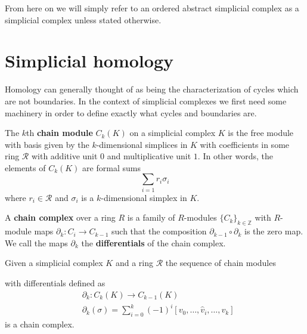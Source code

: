 From here on we will simply refer to an ordered abstract simplicial complex as a simplicial complex unless stated otherwise.
\section{Simplicial homology}
Homology can generally thought of as being the characterization of cycles which are not boundaries. In the context of simplicial complexes we first need some machinery in order to define exactly what cycles and boundaries are.

\begin{definition}
  The $k$th \textbf{chain module} $C_{k}(K)$ on a simplicial complex $K$ is the free module with basis given by the $k$-dimensional simplices in $K$ with coefficients in some ring $\mathcal{R}$ with additive unit $0$ and multiplicative unit $1$. In other words, the elements of $C_{k}(K)$ are formal sums
  \[ \sum_{i=1} r_{i}\sigma_{i}\]
  where $r_{i} \in \mathcal{R}$ and $\sigma_{i}$ is a $k$-dimensional simplex in $K$.
\end{definition}
\begin{definition}
  A \textbf{chain complex} over a ring $R$ is a family of $R$-modules $\{C_{k}\}_{k
  \in \mathbb{Z}}$ with $R$-module maps $\partial_{k}: C_{i} \to C_{k-1}$ such that the composition $\partial_{k-1} \circ \partial_{k}$ is the zero map. We call the maps $\partial_{k}$ the \textbf{differentials} of the chain complex.
\end{definition}
\begin{theorem}
Given a simplicial complex $K$ and a ring $\mathcal{R}$ the sequence of chain modules
\begin{center}
\end{center}
with differentials defined as
\begin{align*}
& \partial_{k}:  C_{k}(K) \to C_{k-1}(K) \\
& \partial_{k}(\sigma) =  \sum^{k}_{{i=0}} (-1)^{i} [v_{0},\dots,\hat v_{i}, \dots, v_{k}]
\end{align*}
is a chain complex.
\end{theorem}

